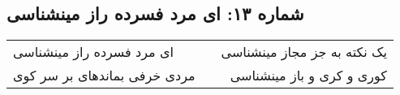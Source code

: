 \begin{center}
\section*{شماره ۱۳: ای مرد فسرده راز مینشناسی}
\label{sec:013}
\begin{longtable}{l p{0.5cm} r}
ای مرد فسرده راز مینشناسی
&&
یک نکته به جز مجاز مینشناسی
\\
مردی خرفی بماندهای بر سر کوی
&&
کوری و کری و باز مینشناسی
\\
\end{longtable}
\end{center}
